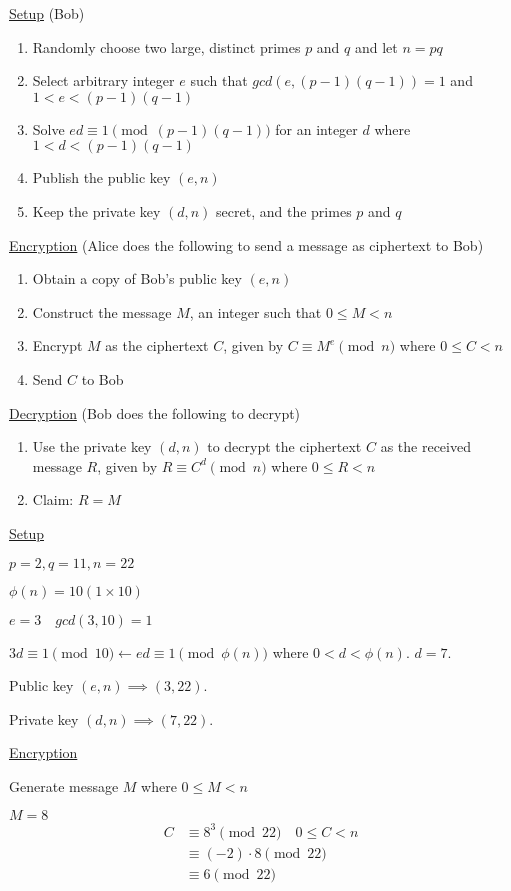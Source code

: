 \documentclass{article}
\begin{document}
\underline{Setup} (Bob)
\begin{enumerate}
    \item Randomly choose two large, distinct primes $p$ and $q$ and let $n = pq$
    \item Select arbitrary integer $e$ such that $gcd(e,(p-1)(q-1)) = 1$ and $1 < e < (p-1)(q-1)$
    \item Solve $ed \equiv 1 \pmod{(p-1)(q-1)}$ for an integer $d$ where $1 < d < (p-1)(q-1)$
    \item Publish the public key $(e,n)$
    \item Keep the private key $(d,n)$ secret, and the primes $p$ and $q$
\end{enumerate}

\underline{Encryption} (Alice does the following to send a message as ciphertext to Bob)
\begin{enumerate}
    \item Obtain a copy of Bob's public key $(e,n)$
    \item Construct the message $M$, an integer such that $0 \le M < n$
    \item Encrypt $M$ as the ciphertext $C$, given by $C \equiv M^e \pmod{n}$ where $0 \le C < n$
    \item Send $C$ to Bob
\end{enumerate}

\underline{Decryption} (Bob does the following to decrypt)
\begin{enumerate}
    \item Use the private key $(d,n)$ to decrypt the ciphertext $C$ as the received message $R$, given by $R \equiv C^d \pmod{n}$ where $0 \le R < n$
    \item Claim: $R = M$
\end{enumerate}

\underline{Setup}

$p = 2, q = 11, n = 22$

$\phi(n) = 10 (1 \times 10)$

$e = 3 \quad gcd(3,10) = 1$

$3d \equiv 1 \pmod{10} \leftarrow ed \equiv 1 \pmod{\phi(n)}$ where $0 < d < \phi(n)$. $d = 7$.

Public key $(e,n) \implies (3,22)$.

Private key $(d,n) \implies (7,22)$.

\underline{Encryption}

Generate message $M$ where $0 \le M < n$

$M = 8$
\begin{align*}
    C &\equiv 8^3 \pmod{22} \quad{0 \le C < n}\\
    &\equiv (-2) \cdot 8 \pmod{22}\\
    &\equiv 6 \pmod{22}
\end{align*}
\end{document}
